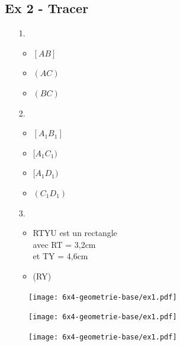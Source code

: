 \newpage


\begin{minipage}[t]{0.25\textwidth}
\subsection*{Ex 2 - Tracer}

\begin{enumerate}
  \item[1.] 
  \begin{itemize}
    \item $[AB]$
    \item $(AC)$
    \item $(BC)$
  \end{itemize}
  \vspace{1.5cm}
  \item[2.] 
  \begin{itemize}
    \item $[A_1 B_1]$
    \item $[A_1 C_1)$
    \item $[A_1 D_1)$
    \item $(C_1D_1)$
  \end{itemize}
  \vspace{1.5cm}
  \item[3.] 
  \begin{itemize}
    \item RTYU est un rectangle\\
     avec RT = 3,2cm \\
     et TY = 4,6cm
    \item (RY)
  \end{itemize}
  \vspace{1cm}
  \item[] 
\end{enumerate}
\end{minipage}
\begin{minipage}[t]{0.75\textwidth}
  \vspace{-0.8cm}
  \begin{figure}[H]
    \centering
    \texttt{[image: 6x4-geometrie-base/ex1.pdf]}
  \end{figure}
  \vspace{-0.5cm}
  \begin{figure}[H]
    \centering
    \texttt{[image: 6x4-geometrie-base/ex1.pdf]}
  \end{figure}
  \vspace{-0.5cm}
  \begin{figure}[H]
    \centering
    \texttt{[image: 6x4-geometrie-base/ex1.pdf]}
  \end{figure}
\end{minipage}

